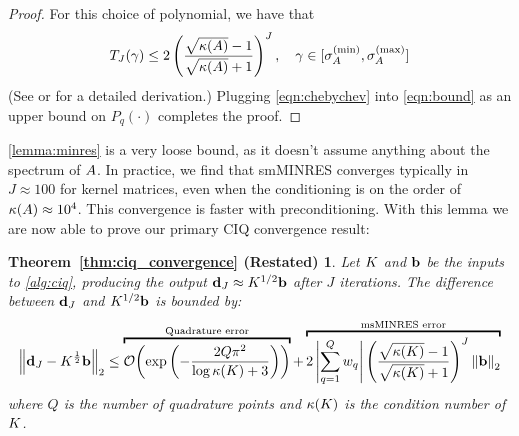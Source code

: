 \begin{proof}
  For this choice of polynomial, we have that
  \begin{equation}
    T_J( \gamma )
    \leq 2 \left( \frac{
      \sqrt{\kappa(A)} - 1
    }{
      \sqrt{\kappa(A)} + 1
    }\right)^J,
    \quad
    \gamma \in [\sigma^{(\min)}_{A}, \sigma^{(\max)}_{A}]
    \label{eqn:chebychev}
  \end{equation}
  (See \citep[e.g.][Sec. 9.2]{shewchuk1994introduction} or \citep[e.g.][Thm. 38.5]{trefethen1997numerical} for a detailed derivation.)
  Plugging \cref{eqn:chebychev} into \cref{eqn:bound} as an upper bound on $P_q(\cdot)$ completes the proof.
\end{proof}

\cref{lemma:minres} is a very loose bound, as it doesn't assume anything about the spectrum of $A$.
In practice, we find that smMINRES converges typically in $J \approx 100$ for kernel matrices, even when the conditioning is on the order of $\kappa(A) \approx 10^4$.
This convergence is faster with preconditioning.
With this lemma we are now able to prove our primary CIQ convergence result:
%
\newtheorem*{thm:ciq_convergence}{Theorem~\ref{thm:ciq_convergence} (Restated)}
\begin{thm:ciq_convergence}
  Let $K$ and $\mathbf{b}$ be the inputs to \cref{alg:ciq}, producing the output $\mathbf{d}_J \approx K^{1/2} \mathbf{b}$ after $J$ iterations.
  The difference between $\mathbf{d}_J$ and $K^{1/2} \mathbf{b}$ is bounded by:
  \begin{equation*}
    \left\Vert \bd_J - \bK^{\frac 1 2} \bb \right\Vert_2
    \leq
    \overbracket{
      \bigo{\exp\left( -\frac{2 Q \pi^2}{\log \kappa(\bK) + 3} \right)}
    }^{\text{Quadrature error}}
    +
    \overbracket{
      2 \left\vert \sum_{q=1}^Q w_q \right\vert
      \left( \frac{ \sqrt{\kappa(\bK)} - 1}{ \sqrt{\kappa(\bK)} + 1} \right)^J
      \left\Vert \bb \right\Vert_2
    }^{\text{msMINRES error}}
  \end{equation*}
  where $Q$ is the number of quadrature points and $\kappa(K)$ is the condition number of $K$.
\end{thm:ciq_convergence}
%
